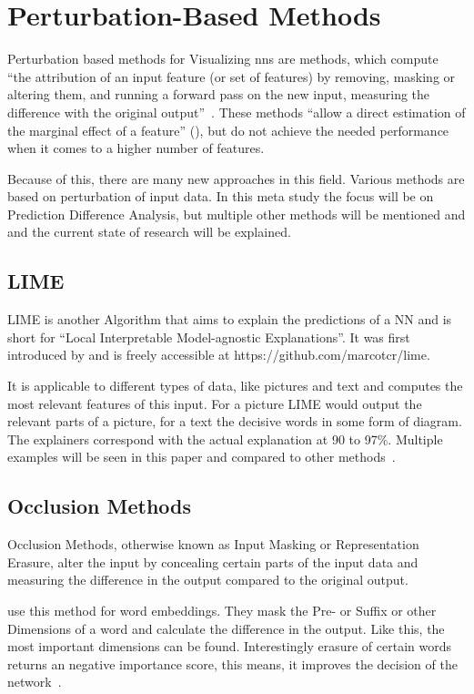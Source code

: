 \section{Perturbation-Based Methods}
Perturbation based methods for Visualizing \glspl{nn} are methods, which compute “the attribution of an input feature (or set of features) by removing, masking or altering them, and running a forward pass on the new input, measuring the difference with the original output”~\cite[2]{Acona.2018}.
These methods “allow a direct estimation of the marginal effect of a feature” (\cite[2]{Acona.2018}), but do not achieve the needed performance when it comes to a higher number of features.
\par
Because of this, there are many new approaches in this field.
Various methods are based on perturbation of input data. In this meta study the focus will be on Prediction Difference Analysis, but multiple other methods will be mentioned and and the current state of research will be explained.


\subsection{LIME}\label{subsect:lime}
LIME is another Algorithm that aims to explain the predictions of a NN and is short for “Local Interpretable Model-agnostic Explanations”. It was first introduced by  and is freely accessible at https://github.com/marcotcr/lime.
\par
It is applicable to different types of data, like pictures and text and computes the most relevant features of this input. For a picture LIME would output the relevant parts of a picture, for a text the decisive words in some form of diagram. The explainers correspond with the actual explanation at 90 to 97\%. Multiple examples will be seen in this paper and compared to other methods~\cite{Ribeiro.2016}.

\subsection{Occlusion Methods}
Occlusion Methods, otherwise known as Input Masking or Representation Erasure, alter the input by concealing certain parts of the input data and measuring the difference in the output compared to the original output. 
\par
{} use this method for word embeddings. They mask the Pre- or Suffix or other Dimensions of a word and calculate the difference in the output. Like this, the most important dimensions can be found. Interestingly erasure of certain words returns an negative importance score, this means, it improves the decision of the network~\cite{Li.2016}.

